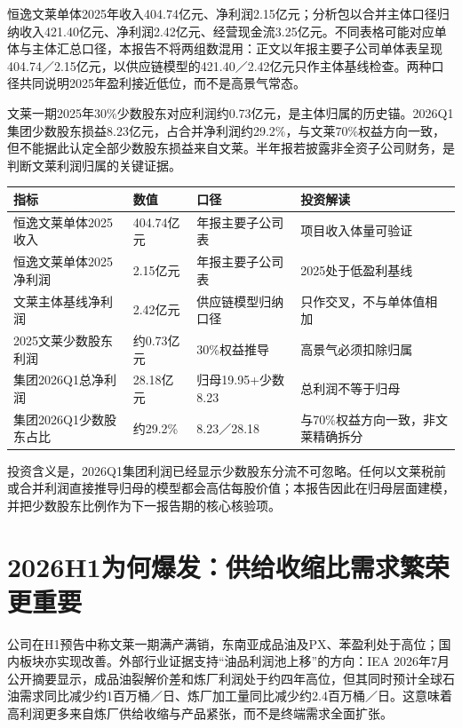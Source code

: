 恒逸文莱单体2025年收入404.74亿元、净利润2.15亿元；分析包以合并主体口径归纳收入421.40亿元、净利润2.42亿元、经营现金流3.25亿元。不同表格可能对应单体与主体汇总口径，本报告不将两组数混用：正文以年报主要子公司单体表呈现404.74／2.15亿元，以供应链模型的421.40／2.42亿元只作主体基线检查。两种口径共同说明2025年盈利接近低位，而不是高景气常态。

文莱一期2025年30\%少数股东对应利润约0.73亿元，是主体归属的历史锚。2026Q1集团少数股东损益8.23亿元，占合并净利润约29.2\%，与文莱70\%权益方向一致，但不能据此认定全部少数股东损益来自文莱。半年报若披露非全资子公司财务，是判断文莱利润归属的关键证据。

\begin{exhibitbox}[文莱与集团利润归属基线]
\noindent\begin{tabularx}{\textwidth}{L{3.55cm}R{2.15cm}L{2.7cm}X}
\toprule
\textbf{指标} & \textbf{数值} & \textbf{口径} & \textbf{投资解读} \\
\midrule
恒逸文莱单体2025收入 & 404.74亿元 & 年报主要子公司表 & 项目收入体量可验证 \\
恒逸文莱单体2025净利润 & 2.15亿元 & 年报主要子公司表 & 2025处于低盈利基线 \\
文莱主体基线净利润 & 2.42亿元 & 供应链模型归纳口径 & 只作交叉，不与单体值相加 \\
2025文莱少数股东利润 & 约0.73亿元 & 30\%权益推导 & 高景气必须扣除归属 \\
集团2026Q1总净利润 & 28.18亿元 & 归母19.95+少数8.23 & 总利润不等于归母 \\
集团2026Q1少数股东占比 & 约29.2\% & 8.23／28.18 & 与70\%权益方向一致，非文莱精确拆分 \\
\bottomrule
\end{tabularx}
\end{exhibitbox}

投资含义是，2026Q1集团利润已经显示少数股东分流不可忽略。任何以文莱税前或合并利润直接推导归母的模型都会高估每股价值；本报告因此在归母层面建模，并把少数股东比例作为下一报告期的核心核验项。

\section{2026H1为何爆发：供给收缩比需求繁荣更重要}

公司在H1预告中称文莱一期满产满销，东南亚成品油及PX、苯盈利处于高位；国内板块亦实现改善。外部行业证据支持“油品利润池上移”的方向：IEA 2026年7月公开摘要显示，成品油裂解价差和炼厂利润处于约四年高位，但其同时预计全球石油需求同比减少约1百万桶／日、炼厂加工量同比减少约2.4百万桶／日。这意味着高利润更多来自炼厂供给收缩与产品紧张，而不是终端需求全面扩张。

